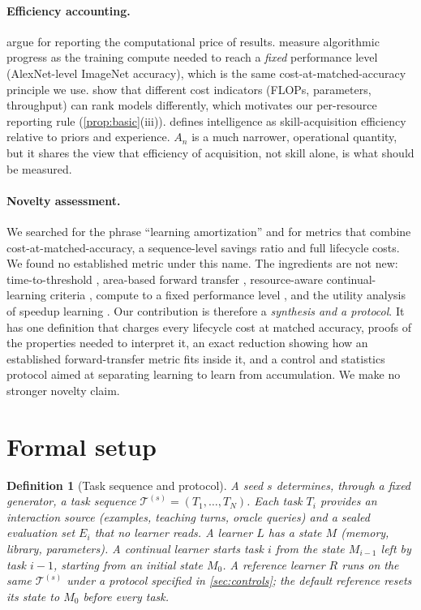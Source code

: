 \documentclass[11pt]{article}
\newtheorem{definition}{Definition}
\theoremstyle{remark}
\newcommand{\cT}{\mathcal{T}}
\begin{document}
\paragraph{Efficiency accounting.}
\citet{schwartz2020green} argue for reporting the computational price of results.
\citet{hernandez2020measuring} measure algorithmic progress as the training compute needed to reach a \emph{fixed} performance level (AlexNet-level ImageNet accuracy), which is the same cost-at-matched-accuracy principle we use.
\citet{dehghani2022efficiency} show that different cost indicators (FLOPs, parameters, throughput) can rank models differently, which motivates our per-resource reporting rule (\cref{prop:basic}(iii)).
\citet{chollet2019measure} defines intelligence as skill-acquisition efficiency relative to priors and experience.
$A_n$ is a much narrower, operational quantity, but it shares the view that efficiency of acquisition, not skill alone, is what should be measured.

\paragraph{Novelty assessment.}
We searched for the phrase ``learning amortization'' and for metrics that combine cost-at-matched-accuracy, a sequence-level savings ratio and full lifecycle costs.
We found no established metric under this name.
The ingredients are not new: time-to-threshold \citep{taylor2009transfer}, area-based forward transfer \citep{wolczyk2021continual}, resource-aware continual-learning criteria \citep{diazrodriguez2018dont}, compute to a fixed performance level \citep{hernandez2020measuring}, and the utility analysis of speedup learning \citep{minton1990quantitative}.
Our contribution is therefore a \emph{synthesis and a protocol}.
It has one definition that charges every lifecycle cost at matched accuracy, proofs of the properties needed to interpret it, an exact reduction showing how an established forward-transfer metric fits inside it, and a control and statistics protocol aimed at separating learning to learn from accumulation.
We make no stronger novelty claim.

\section{Formal setup}\label{sec:setup}

\begin{definition}[Task sequence and protocol]\label{def:protocol}
A seed $s$ determines, through a fixed generator, a task sequence $\cT^{(s)} = (T_1,\dots,T_N)$.
Each task $T_i$ provides an interaction source (examples, teaching turns, oracle queries) and a \emph{sealed} evaluation set $E_i$ that no learner reads.
A learner $L$ has a state $M$ (memory, library, parameters).
A \emph{continual} learner starts task $i$ from the state $M_{i-1}$ left by task $i-1$, starting from an initial state $M_0$.
A \emph{reference} learner $R$ runs on the same $\cT^{(s)}$ under a protocol specified in \cref{sec:controls}; the default reference resets its state to $M_0$ before every task.
\end{definition}
\end{document}
